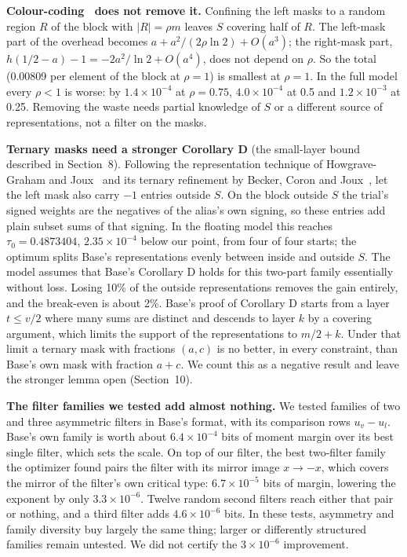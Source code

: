 \documentclass[11pt]{article}
\theoremstyle{plain}
\begin{document}
\textbf{Colour-coding~\cite{ayz} does not remove it.} Confining the left masks to a random region $R$ of the block with $|R| = \rho m$ leaves $S$ covering half of $R$. The left-mask part of the overhead becomes $a + a^2/(2\rho \ln 2) + O(a^3)$; the right-mask part, $h(1/2 - a) - 1 = -2a^2/\ln 2 + O(a^4)$, does not depend on $\rho$. So the total (0.00809 per element of the block at $\rho = 1$) is smallest at $\rho = 1$. In the full model every $\rho < 1$ is worse: by $1.4\times10^{-4}$ at $\rho = 0.75$, $4.0\times10^{-4}$ at 0.5 and $1.2\times10^{-3}$ at 0.25. Removing the waste needs partial knowledge of $S$ or a different source of representations, not a filter on the masks.

\textbf{Ternary masks need a stronger Corollary D} (the small-layer bound described in Section~8). Following the representation technique of Howgrave-Graham and Joux~\cite{hgj} and its ternary refinement by Becker, Coron and Joux~\cite{bcj}, let the left mask also carry $-1$ entries outside $S$. On the block outside $S$ the trial's signed weights are the negatives of the alias's own signing, so these entries add plain subset sums of that signing. In the floating model this reaches $\tau_0 = 0.4873404$, $2.35\times10^{-4}$ below our point, from four of four starts; the optimum splits Base's representations evenly between inside and outside $S$. The model assumes that Base's Corollary D holds for this two-part family essentially without loss. Losing 10\% of the outside representations removes the gain entirely, and the break-even is about 2\%. Base's proof of Corollary D starts from a layer $t \le v/2$ where many sums are distinct and descends to layer $k$ by a covering argument, which limits the support of the representations to $m/2 + k$. Under that limit a ternary mask with fractions $(a, c)$ is no better, in every constraint, than Base's own mask with fraction $a + c$. We count this as a negative result and leave the stronger lemma open (Section~10).

\textbf{The filter families we tested add almost nothing.} We tested families of two and three asymmetric filters in Base's format, with its comparison rows $u_v - u_l$. Base's own family is worth about $6.4\times10^{-4}$ bits of moment margin over its best single filter, which sets the scale. On top of our filter, the best two-filter family the optimizer found pairs the filter with its mirror image $x \to -x$, which covers the mirror of the filter's own critical type: $6.7\times10^{-5}$ bits of margin, lowering the exponent by only $3.3\times10^{-6}$. Twelve random second filters reach either that pair or nothing, and a third filter adds $4.6\times10^{-6}$ bits. In these tests, asymmetry and family diversity buy largely the same thing; larger or differently structured families remain untested. We did not certify the $3\times10^{-6}$ improvement.
\end{document}
